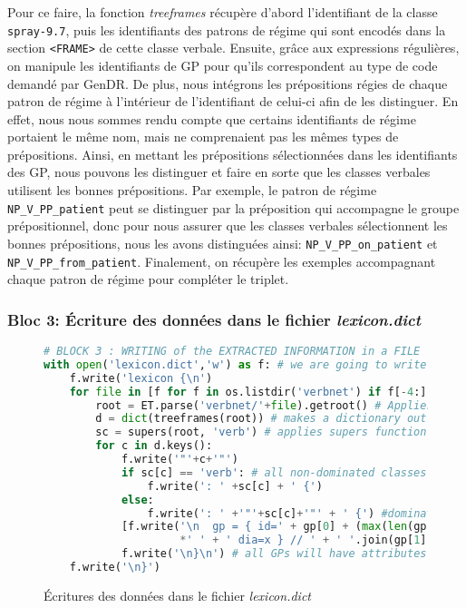 Pour ce faire, la fonction \emph{treeframes} récupère d'abord l'identifiant de la classe \texttt{spray-9.7}, puis les identifiants des patrons de régime qui sont encodés dans la section \texttt{<FRAME>} de cette classe verbale. Ensuite, grâce aux expressions régulières, on manipule les identifiants de \ac{GP} pour qu'ils correspondent au type de code demandé par GenDR. De plus, nous intégrons les prépositions régies de chaque patron de régime à l'intérieur de l'identifiant de celui-ci afin de les distinguer. En effet, nous nous sommes rendu compte que certains identifiants de régime portaient le même nom, mais ne comprenaient pas les mêmes types de prépositions. Ainsi, en mettant les prépositions sélectionnées dans les identifiants des \ac{GP}, nous pouvons les distinguer et faire en sorte que les classes verbales utilisent les bonnes prépositions. Par exemple, le patron de régime \lstinline|NP_V_PP_patient| peut se distinguer par la préposition qui accompagne le groupe prépositionnel, donc pour nous assurer que les classes verbales sélectionnent les bonnes prépositions, nous les avons distinguées ainsi: \lstinline|NP_V_PP_on_patient| et \lstinline|NP_V_PP_from_patient|. Finalement, on récupère les exemples accompagnant chaque patron de régime pour compléter le triplet.

\subsubsection{Bloc 3: Écriture des données dans le fichier \emph{lexicon.dict}}

\begin{figure}[htb]
  \caption{Écritures des données dans le fichier \emph{lexicon.dict}}
	\label{fig:archivn-bloc3}
\begin{lstlisting}[language=Python]		
# BLOCK 3 : WRITING of the EXTRACTED INFORMATION in a FILE
with open('lexicon.dict','w') as f: # we are going to write all of this block into lexicon.dict
    f.write('lexicon {\n')
    for file in [f for f in os.listdir('verbnet') if f[-4:] == '.xml']: # open VerbNet XMl files
        root = ET.parse('verbnet/'+file).getroot() # Applies the Python Element Tree module
        d = dict(treeframes(root)) # makes a dictionary out of the results of treeframes on a file
        sc = supers(root, 'verb') # applies supers function to each file
        for c in d.keys():
            f.write('"'+c+'"')
            if sc[c] == 'verb': # all non-dominated classes point to the default verb class
                f.write(': ' +sc[c] + ' {') 
            else:
                f.write(': ' +'"'+sc[c]+'"' + ' {') #dominated classes point towards their governor
            [f.write('\n  gp = { id=' + gp[0] + (max(len(gp[0]), 30)-len(gp[0]))
                     *' ' + ' dia=x } // ' + ' '.join(gp[1])) for gp in d[c]]
            f.write('\n}\n') # all GPs will have attributes: id and dia
    f.write('\n}')
\end{lstlisting}
\end{figure}

